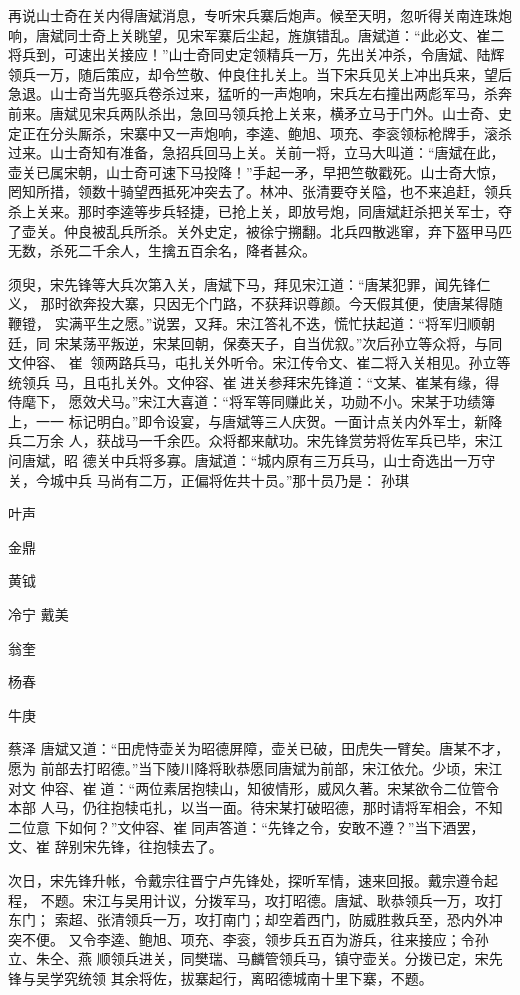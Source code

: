 再说山士奇在关内得唐斌消息，专听宋兵寨后炮声。候至天明，忽听得关南连珠炮
响，唐斌同士奇上关眺望，见宋军寨后尘起，旌旗错乱。唐斌道：“此必文、崔二
将兵到，可速出关接应！”山士奇同史定领精兵一万，先出关冲杀，令唐斌、陆辉
领兵一万，随后策应，却令竺敬、仲良住扎关上。当下宋兵见关上冲出兵来，望后
急退。山士奇当先驱兵卷杀过来，猛听的一声炮响，宋兵左右撞出两彪军马，杀奔
前来。唐斌见宋兵两队杀出，急回马领兵抢上关来，横矛立马于门外。山士奇、史
定正在分头厮杀，宋寨中又一声炮响，李逵、鲍旭、项充、李衮领标枪牌手，滚杀
过来。山士奇知有准备，急招兵回马上关。关前一将，立马大叫道：“唐斌在此，
壶关已属宋朝，山士奇可速下马投降！”手起一矛，早把竺敬戳死。山士奇大惊，
罔知所措，领数十骑望西抵死冲突去了。林冲、张清要夺关隘，也不来追赶，领兵
杀上关来。那时李逵等步兵轻捷，已抢上关，即放号炮，同唐斌赶杀把关军士，夺
了壶关。仲良被乱兵所杀。关外史定，被徐宁搠翻。北兵四散逃窜，弃下盔甲马匹
无数，杀死二千余人，生擒五百余名，降者甚众。

须臾，宋先锋等大兵次第入关，唐斌下马，拜见宋江道：“唐某犯罪，闻先锋仁义，
那时欲奔投大寨，只因无个门路，不获拜识尊颜。今天假其便，使唐某得随鞭镫，
实满平生之愿。”说罢，又拜。宋江答礼不迭，慌忙扶起道：“将军归顺朝廷，同
宋某荡平叛逆，宋某回朝，保奏天子，自当优叙。”次后孙立等众将，与同文仲容、
崔，领两路兵马，屯扎关外听令。宋江传令文、崔二将入关相见。孙立等统领兵
马，且屯扎关外。文仲容、崔进关参拜宋先锋道：“文某、崔某有缘，得侍麾下，
愿效犬马。”宋江大喜道：“将军等同赚此关，功勋不小。宋某于功绩簿上，一一
标记明白。”即令设宴，与唐斌等三人庆贺。一面计点关内外军士，新降兵二万余
人，获战马一千余匹。众将都来献功。宋先锋赏劳将佐军兵已毕，宋江问唐斌，昭
德关中兵将多寡。唐斌道：“城内原有三万兵马，山士奇选出一万守关，今城中兵
马尚有二万，正偏将佐共十员。”那十员乃是：
孙琪

叶声

金鼎

黄钺

冷宁
戴美

翁奎

杨春

牛庚

蔡泽
唐斌又道：“田虎恃壶关为昭德屏障，壶关已破，田虎失一臂矣。唐某不才，愿为
前部去打昭德。”当下陵川降将耿恭愿同唐斌为前部，宋江依允。少顷，宋江对文
仲容、崔道：“两位素居抱犊山，知彼情形，威风久著。宋某欲令二位管令本部
人马，仍往抱犊屯扎，以当一面。待宋某打破昭德，那时请将军相会，不知二位意
下如何？”文仲容、崔同声答道：“先锋之令，安敢不遵？”当下酒罢，文、崔
辞别宋先锋，往抱犊去了。

次日，宋先锋升帐，令戴宗往晋宁卢先锋处，探听军情，速来回报。戴宗遵令起程，
不题。宋江与吴用计议，分拨军马，攻打昭德。唐斌、耿恭领兵一万，攻打东门；
索超、张清领兵一万，攻打南门；却空着西门，防威胜救兵至，恐内外冲突不便。
又令李逵、鲍旭、项充、李衮，领步兵五百为游兵，往来接应；令孙立、朱仝、燕
顺领兵进关，同樊瑞、马麟管领兵马，镇守壶关。分拨已定，宋先锋与吴学究统领
其余将佐，拔寨起行，离昭德城南十里下寨，不题。

